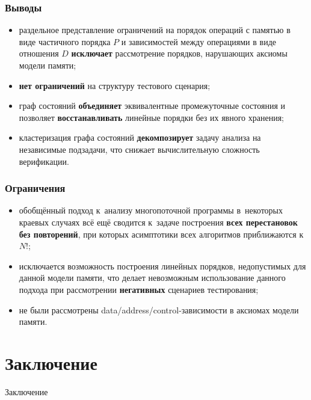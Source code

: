 \begin{frame}
  \frametitle{Выводы}

  \begin{itemize}
    \item
      раздельное представление ограничений на порядок операций с
      памятью в виде частичного порядка $P$ и зависимостей между
      операциями в виде отношения $D$ \textbf{исключает} рассмотрение
      порядков, нарушающих аксиомы модели памяти;
    \item
      \textbf{нет ограничений} на структуру тестового сценария;
    \item
      граф состояний \textbf{объединяет} эквивалентные промежуточные
      состояния и позволяет \textbf{восстанавливать} линейные порядки
      без их явного хранения;
    \item
      кластеризация графа состояний \textbf{декомпозирует}
      задачу анализа на независимые подзадачи, что снижает
      вычислительную сложность верификации.
  \end{itemize}

\end{frame}

\begin{frame}
  \frametitle{Ограничения}

  \begin{itemize}
    \item
      обобщённый подход к~анализу многопоточной программы в~некоторых
      краевых случаях всё ещё сводится к~задаче построения \textbf{всех
      перестановок без повторений}, при которых асимптотики всех
      алгоритмов приближаются к $N!$;
    \item
      исключается возможность построения линейных порядков, недопустимых
      для данной модели памяти, что делает невозможным использование
      данного подхода при рассмотрении \textbf{негативных} сценариев
      тестирования;
    \item
      не были рассмотрены data/address/control-зависимости в
      аксиомах модели памяти.
  \end{itemize}


\end{frame}

\section{Заключение}
\begin{frame}[plain]
  \begin{center}
    \Huge
    Заключение
  \end{center}
\end{frame}


